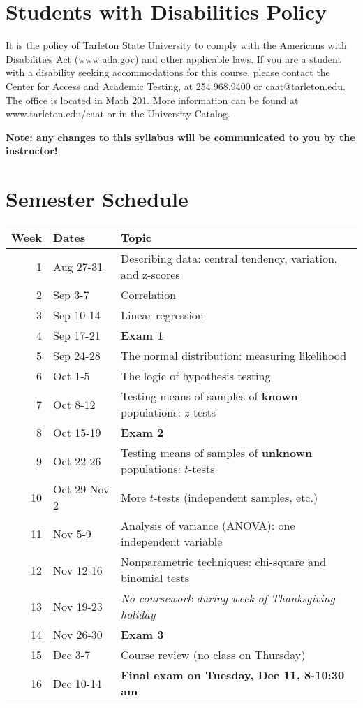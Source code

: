 \documentclass[10pt]{article}
\begin{document}
\section*{Students with Disabilities Policy}
\label{sec:org66a6d6c}

It is the policy of Tarleton State University to comply with the Americans with Disabilities  Act (www.ada.gov) and other applicable laws.  If you are a student with a disability seeking accommodations for this course, please contact the Center for Access and Academic Testing, at 254.968.9400 or caat@tarleton.edu. The office is located in Math 201. More information can be found at www.tarleton.edu/caat or in the University Catalog.​

\textbf{Note:  any changes to this syllabus will be communicated to you by the instructor!}

\section*{Semester Schedule}
\label{sec:org45df5e4}
\begin{center}
\begin{tabular}{rll}
Week & Dates & Topic\\
\hline
1 & Aug 27-31 & Describing data: central tendency, variation, and z-scores\\
2 & Sep 3-7 & Correlation\\
3 & Sep 10-14 & Linear regression\\
4 & Sep 17-21 & \textbf{Exam 1}\\
5 & Sep 24-28 & The normal distribution: measuring likelihood\\
6 & Oct 1-5 & The logic of hypothesis testing\\
7 & Oct 8-12 & Testing means of samples of \textbf{known} populations: \(z\)-tests\\
8 & Oct 15-19 & \textbf{Exam 2}\\
9 & Oct 22-26 & Testing means of samples of \textbf{unknown} populations: \(t\)-tests\\
10 & Oct 29-Nov 2 & More \(t\)-tests (independent samples, etc.)\\
11 & Nov 5-9 & Analysis of variance (ANOVA): one independent variable\\
12 & Nov 12-16 & Nonparametric techniques: chi-square and binomial tests\\
13 & Nov 19-23 & \emph{No coursework during week of Thanksgiving holiday}\\
14 & Nov 26-30 & \textbf{Exam 3}\\
15 & Dec 3-7 & Course review (no class on Thursday)\\
16 & Dec 10-14 & \textbf{Final exam on Tuesday, Dec 11, 8-10:30 am}\\
\end{tabular}
\end{center}
\end{document}
